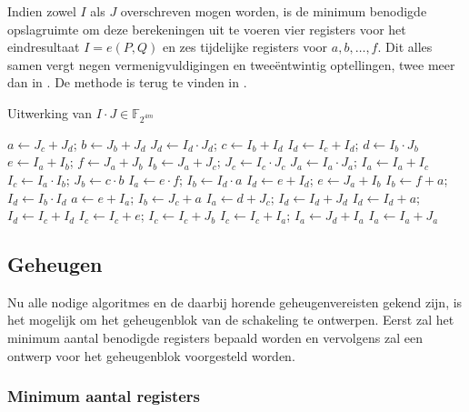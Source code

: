 Indien zowel $I$ als $J$ overschreven mogen worden, is de minimum benodigde opslagruimte om deze berekeningen uit te voeren vier registers voor het eindresultaat $I = e(P, Q)$ en zes tijdelijke registers voor $a, b, \ldots, f$. Dit alles samen vergt negen vermenigvuldigingen en twee\"entwintig optellingen, twee meer dan in \cite{beuchat}. De methode is terug te vinden in .

\begin{algorithm}
	\caption{Uitwerking van $I \cdot J \in \mathbb{F}_{2^{4m}}$}
	\label{algoritme-implementatie-miller-f4m-mult}
	$a \leftarrow J_c + J_d$; $b \leftarrow J_b + J_d$\;
	$J_d \leftarrow I_d \cdot J_d$; $c \leftarrow I_b + I_d$\;
	$I_d \leftarrow I_c + I_d$; $d \leftarrow I_b \cdot J_b$\;
	$e \leftarrow I_a + I_b$; $f \leftarrow J_a + J_b$\;
	$I_b \leftarrow J_a + J_c$; $J_c \leftarrow I_c \cdot J_c$\;
	$J_a \leftarrow I_a \cdot J_a$; $I_a \leftarrow I_a + I_c$\;
	$I_c \leftarrow I_a \cdot I_b$; $J_b \leftarrow c \cdot b$\;
	$I_a \leftarrow e \cdot f$; $I_b \leftarrow I_d \cdot a$ \;
	$I_d \leftarrow e + I_d$; $e \leftarrow J_a + I_b$\;
	$I_b \leftarrow f + a$; $I_d \leftarrow I_b \cdot I_d$\;
	$a \leftarrow e + I_a$; $I_b \leftarrow J_c + a$\;
	$I_a \leftarrow d + J_c$; $I_d \leftarrow I_d + J_d$\;
	$I_d \leftarrow I_d + a$; $I_d \leftarrow I_c + I_d$\;
	$I_c \leftarrow I_c + e$; $I_c \leftarrow I_c + J_b$\;
	$I_c \leftarrow I_c + I_a$; $I_a \leftarrow J_d + I_a$\;
	$I_a \leftarrow I_a + J_a$\;
\end{algorithm}

\subsection{Geheugen}

Nu alle nodige algoritmes en de daarbij horende geheugenvereisten gekend zijn, is het mogelijk om het geheugenblok van de schakeling te ontwerpen. Eerst zal het minimum aantal benodigde registers bepaald worden en vervolgens zal een ontwerp voor het geheugenblok voorgesteld worden.

\subsubsection{Minimum aantal registers}


